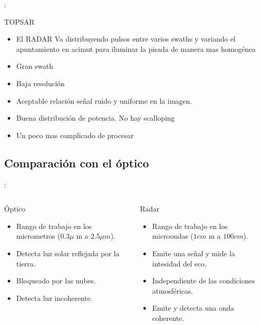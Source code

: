 \begin{frame}{\secname : \subsecname}
    \begin{block}{TOPSAR}
      \begin{itemize}
        \item El RADAR Va distribuyendo pulsos entre varios swaths y variando el apuntamiento en acimut para iluminar la pisada de manera mas homogénea
        \item Gran swath
        \item Baja resolución
        \item Aceptable relación señal ruido y uniforme en la imagen.
        \item Buena distribución de potencia. No hay scalloping
        \item Un poco mas complicado de procesar
      \end{itemize}
    \end{block}
\end{frame}

\subsection{Comparación con el óptico}
\begin{frame}{\secname : \subsecname}
\begin{columns}
  \begin{column}{0.5\textwidth}
   \begin{block}{Óptico}
     \begin{itemize}
       \item Rango de trabajo en los micrometros ($0.3\mu$ m a $2.5\mu m$).
       \item Detecta luz solar reflejada por la tierra.
       \item Bloqueado por las nubes.
       \item Detecta luz incoherente.
     \end{itemize}
   \end{block}
  \end{column}
  \begin{column}{0.5\textwidth}  %
    \begin{block}{Radar}
      \begin{itemize}
        \item Rango de trabajo en los microondas ($1cm$ m a $100cm$).
        \item Emite una señal y mide la intesidad del eco.
        \item Independiente de las condiciones atmosféricas.
        \item Emite y detecta una onda coherente.
      \end{itemize}
    \end{block}
  \end{column}
  \end{columns}
\end{frame}

